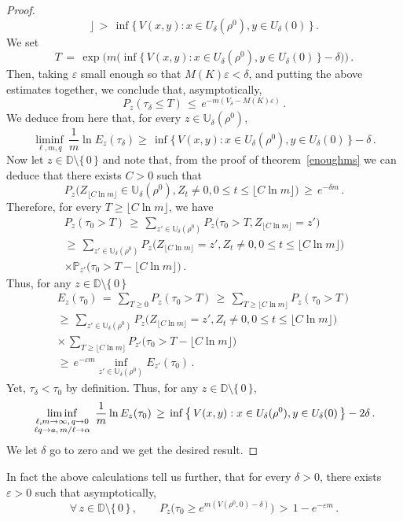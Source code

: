\documentclass[a4paper,12pt]{article}
\theoremstyle{definition}
\theoremstyle{remark}
\def \a {\alpha}
\def \d {\delta}
\def \e {\varepsilon}
\def \dD {\mathbb{D}}
\def \P {\mathbb{P}}
\def \dU {\mathbb{U}}
\def\lmq {{\genfrac{}{}{0pt}{1}{\ell,m\to\infty,\,q\to0}{\ell q\to a,\,m/\ell\to\a}}}
\begin{document}
\begin{proof}
$$\Big\rfloor\,>\,
\inf\big\lbrace\,
V(x,y):x\in U_\d(\rho^0), y\in U_\d(0)
\,\big\rbrace\,.$$
We set 
$$T\,=\,\exp\bigg(
m\Big(
\inf\big\lbrace\,
V(x,y):x\in U_\d(\rho^0),y\in U_\d(0)
\,\big\rbrace-\d
\Big)
\bigg)\,.$$
Then, taking $\e$ small enough so that $M(K)\e<\d$,
and putting the above estimates together, we conclude that, asymptotically,
$$P_z(\tau_\d\leq T)\,\leq\,e^{-m(V_\d-M(K)\e)}\,.$$
We deduce from here that,
for every $z\in\dU_\d(\rho^0)$,
$$
\liminf_{\ell,m,q}\,\frac{1}{m}\ln E_z(\tau_\d)
\geq\,\inf\big\lbrace\,
V(x,y):x\in U_\d(\rho^0),y\in U_\d(0)
\,\big\rbrace-\d\,.
$$
Now let $z\in\dD\setminus\lbrace\,0\,\rbrace$ 
and note that, from the proof of theorem~\ref{enoughms}
we can deduce that there exists $C>0$ such that
$$
P_z\big(
Z_{\lfloor C\ln m\rfloor}\in\dU_\d(\rho^0),
Z_t\neq 0, 0\leq t\leq \lfloor C \ln m\rfloor
\big)\,\geq\,e^{-\d m}\,.
$$
Therefore, for every $T\geq \lfloor C\ln m\rfloor$, 
we have
\begin{multline*}
P_z(\tau_0>T)\,\geq\,
\sum_{z'\in\dU_\d(\rho^0)}P_z\big(
\tau_0>T,Z_{\lfloor C\ln  m\rfloor}=z'
\big)\\
\geq\,\sum_{z'\in\dU_\d(\rho^0)}P_z\big(
Z_{\lfloor C\ln m\rfloor}=z',Z_t\neq 0,0\leq t\leq \lfloor C\ln m\rfloor
\big)\\
\times\P_{z'}\big(
\tau_0>T-\lfloor C\ln m\rfloor
\big)\,.
\end{multline*}
Thus, for any $z\in\dD\setminus\lbrace\,0\,\rbrace$
\begin{multline*}E_z(\tau_0)\,=\,\sum_{T\geq0}P_z(\tau_0>T)\,\geq\,
\sum_{T\geq \lfloor C\ln m\rfloor}P_z(\tau_0>T)\\
\geq\,\sum_{z'\in\dU_\d(\rho^0)}P_z\big(
Z_{\lfloor C\ln m\rfloor}=z',Z_t\neq 0,0\leq t\leq\lfloor C \ln m\rfloor
\big)\\
\times\,\sum_{T\geq \lfloor C\ln m\rfloor}P_{z'}\big(
\tau_0>T-\lfloor C\ln m\rfloor
\big)\\
\geq\,e^{-\e m}\inf_{z'\in\dU_\d(\rho^0)}E_{z'}(\tau_0)\,.
\end{multline*}
Yet, $\tau_\d<\tau_0$ by definition. Thus,
for any $z\in\dD\setminus\lbrace\,0\,\rbrace$,
$$\liminf_\lmq\,\frac{1}{m}\ln E_z(\tau_0)\,\geq\,\inf\big\lbrace\,
V(x,y):x\in U_\d(\rho^0),y\in U_\d(0)
\,\big\rbrace-2\d\,.$$
We let $\d$ go to zero and we get the desired result.
\end{proof}
In fact
the above calculations tell us further,
that for every $\d>0$, there exists $\e>0$ such that asymptotically,
$$\forall\,z\in\dD\setminus\lbrace\,0\,\rbrace\,,\qquad
P_z\big(
\tau_0\geq e^{m(V(\rho^0,0)-\d)}
\big)\,>\,1-e^{-\e m}\,.$$
\end{document}
